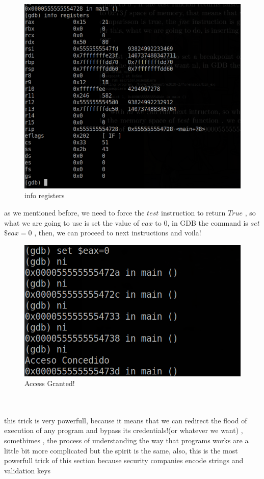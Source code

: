 \documentclass[10pt,a4paper]{article} %
\begin{document}
            \begin{figure}[h!]
                \centering
                \includegraphics[width=0.4\linewidth]{infor.png}
                \caption{info registers}
                \label{fig:infor}
            \end{figure}
            \newpage
            as we mentioned before, we need to force the $ test  $ instruction to
            return $ True  $ , so what we are going to use is set the value of $
            eax  $ to 0, in GDB the command is $ set $    $ \$eax=0  $ , then, we can
            proceed to next instructions and voila!
            \\
            \begin{figure}[h!]
                \centering
                \includegraphics[width=0.8\linewidth]{concedido.png}
                \caption{Access Granted!}
                \label{fig:concedido}
            \end{figure}
            \\
            \\
            this trick is very powerfull, because it means that we can redirect the
            flood of execution of any program and bypass its credentials!(or
            whatever we want) ,  somethimes , the process of understanding the
            way that
            programs works are a little bit more complicated but the spirit is the
            same, also, this is the most powerfull trick of this section
            because security companies encode strings and validation keys
\end{document}
